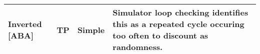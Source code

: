 \begin{center}
\begin{tabularx}{\textwidth}{ || p{} | p{} | p{} | p{} || }
Inverted \m{supportCoin} [ABA] & TP & Simple & Simulator loop checking identifies this as a repeated cycle occuring too often to discount as randomness. 
\\ \hline
\hline \hline
\end{tabularx}
\end{center}
